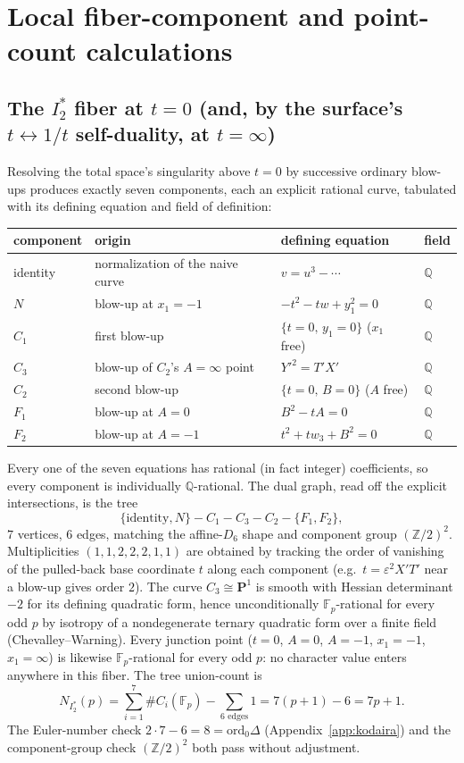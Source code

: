 \documentclass[11pt]{amsart}
\theoremstyle{definition}
\newcommand{\Fp}{\mathbb{F}_p}
\newcommand{\Q}{\mathbb{Q}}
\newcommand{\Z}{\mathbb{Z}}
\begin{document}
\section{Local fiber-component and point-count calculations}
\label{app:fibers}

\subsection*{The \texorpdfstring{$I_2^*$}{I2*} fiber at \texorpdfstring{$t=0$}{t=0} (and, by the surface's \texorpdfstring{$t\leftrightarrow1/t$}{t <-> 1/t} self-duality, at \texorpdfstring{$t=\infty$}{t=infinity})}

Resolving the total space's singularity above $t=0$ by successive ordinary blow-ups produces exactly seven components, each an explicit rational curve, tabulated with its defining equation and field of definition:

\begin{center}
\begin{tabular}{l l l l}
component & origin & defining equation & field \\\hline
identity & normalization of the naive curve & $v=u^3-\cdots$ & $\Q$ \\
$N$ & blow-up at $x_1=-1$ & $-t^2-tw+y_1^2=0$ & $\Q$ \\
$C_1$ & first blow-up & $\{t=0,\,y_1=0\}$ ($x_1$ free) & $\Q$ \\
$C_3$ & blow-up of $C_2$'s $A=\infty$ point & $Y'^2=T'X'$ & $\Q$ \\
$C_2$ & second blow-up & $\{t=0,\,B=0\}$ ($A$ free) & $\Q$ \\
$F_1$ & blow-up at $A=0$ & $B^2-tA=0$ & $\Q$ \\
$F_2$ & blow-up at $A=-1$ & $t^2+tw_3+B^2=0$ & $\Q$
\end{tabular}
\end{center}

Every one of the seven equations has rational (in fact integer) coefficients, so every component is individually $\Q$-rational. The dual graph, read off the explicit intersections, is the tree
\[
\{\text{identity},N\}-C_1-C_3-C_2-\{F_1,F_2\},
\]
$7$ vertices, $6$ edges, matching the affine-$D_6$ shape and component group $(\Z/2)^2$. Multiplicities $(1,1,2,2,2,1,1)$ are obtained by tracking the order of vanishing of the pulled-back base coordinate $t$ along each component (e.g.\ $t=\varepsilon^2X'T'$ near a blow-up gives order $2$). The curve $C_3\cong\mathbf P^1$ is smooth with Hessian determinant $-2$ for its defining quadratic form, hence unconditionally $\Fp$-rational for every odd $p$ by isotropy of a nondegenerate ternary quadratic form over a finite field (Chevalley--Warning). Every junction point ($t=0$, $A=0$, $A=-1$, $x_1=-1$, $x_1=\infty$) is likewise $\Fp$-rational for every odd $p$: no character value enters anywhere in this fiber. The tree union-count is
\[
N_{I_2^*}(p) = \sum_{i=1}^7\#C_i(\Fp) - \sum_{\text{6 edges}}1 = 7(p+1)-6=7p+1.
\]
The Euler-number check $2\cdot7-6=8=\mathrm{ord}_0\Delta$ (Appendix~\ref{app:kodaira}) and the component-group check $(\Z/2)^2$ both pass without adjustment.
\end{document}
